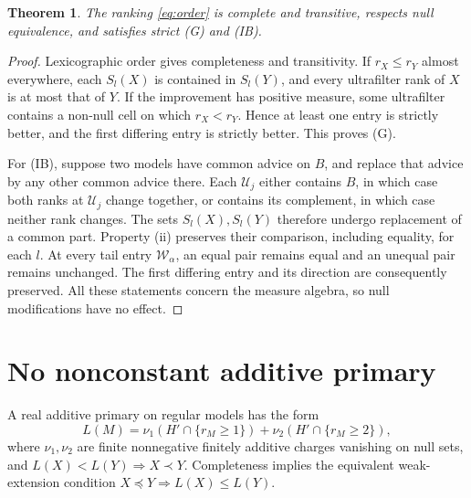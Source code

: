 \documentclass[11pt]{article}
\newtheorem{theorem}{Theorem}
\theoremstyle{remark}\newtheorem{remark}[theorem]{Remark}
\newcommand{\U}{\mathcal U}
\newcommand{\W}{\mathcal W}
\begin{document}
\begin{theorem}\label{thm:GIB}
The ranking \eqref{eq:order} is complete and transitive, respects null
equivalence, and satisfies strict (G) and (IB).
\end{theorem}
\begin{proof}
Lexicographic order gives completeness and transitivity. If
$r_X\le r_Y$ almost everywhere, each $S_l(X)$ is contained in $S_l(Y)$,
and every ultrafilter rank of $X$ is at most that of $Y$. If the
improvement has positive measure, some ultrafilter contains a non-null
cell on which $r_X<r_Y$. Hence at least one entry is strictly better,
and the first differing entry is strictly better. This proves (G).

For (IB), suppose two models have common advice on $B$, and replace
that advice by any other common advice there. Each $\U_j$ either
contains $B$, in which case both ranks at $\U_j$ change together, or
contains its complement, in which case neither rank changes. The sets
$S_l(X),S_l(Y)$ therefore undergo replacement of a common part.
Property (ii) preserves their comparison, including equality, for each
$l$. At every tail entry $\W_\alpha$, an equal pair remains equal and
an unequal pair remains unchanged. The first differing entry and its
direction are consequently preserved. All these statements concern
the measure algebra, so null modifications have no effect.
\end{proof}

\section{No nonconstant additive primary}

A real additive primary on regular models has the form
\begin{equation}
 L(M)=\nu_1(H'\cap\{r_M\ge1\})+
       \nu_2(H'\cap\{r_M\ge2\}),                       \label{eq:primary}
\end{equation}
where $\nu_1,\nu_2$ are finite nonnegative finitely additive charges
vanishing on null sets, and
$L(X)<L(Y)\Rightarrow X\prec Y$. Completeness implies the equivalent
weak-extension condition $X\preceq Y\Rightarrow L(X)\le L(Y)$.
\end{document}
